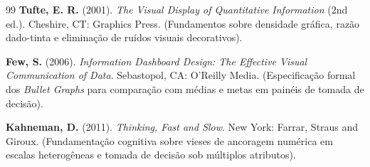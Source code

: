 \documentclass[9pt,a4paper]{extarticle}
\begin{document}
\begin{thebibliography}{99}
\textbf{Tufte, E. R.} (2001). \emph{The Visual Display of Quantitative Information} (2nd ed.). Cheshire, CT: Graphics Press. (Fundamentos sobre densidade gráfica, razão dado-tinta e eliminação de ruídos visuais decorativos).

\textbf{Few, S.} (2006). \emph{Information Dashboard Design: The Effective Visual Communication of Data}. Sebastopol, CA: O'Reilly Media. (Especificação formal dos \emph{Bullet Graphs} para comparação com médias e metas em painéis de tomada de decisão).

\textbf{Kahneman, D.} (2011). \emph{Thinking, Fast and Slow}. New York: Farrar, Straus and Giroux. (Fundamentação cognitiva sobre vieses de ancoragem numérica em escalas heterogêneas e tomada de decisão sob múltiplos atributos).

\end{thebibliography}
\end{document}
